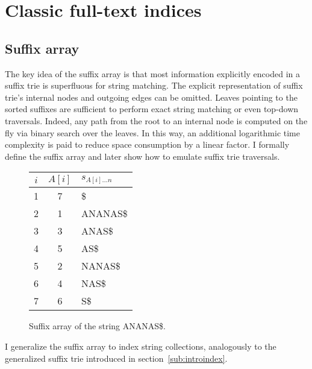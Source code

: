 \section{Classic full-text indices}

\subsection{Suffix array}

The key idea of the suffix array \citep{Manber1990} is that most information explicitly encoded in a suffix trie is superfluous for string matching.
The explicit representation of suffix trie's internal nodes and outgoing edges can be omitted.
Leaves pointing to the sorted suffixes are sufficient to perform exact string matching or even top-down traversals.
Indeed, any path from the root to an internal node is computed on the fly via binary search over the leaves.
In this way, an additional logarithmic time complexity is paid to reduce space consumption by a linear factor.
I formally define the suffix array and later show how to emulate suffix trie traversals.


\begin{figure}[h]
\begin{center}
\caption[Example of suffix array]{Suffix array of the string {\ttfamily ANANAS\$}.}
\label{fig:sa}
\ttfamily
\begin{tabular}{ccl}
$i$ & $A[i]$ & $s_{A[i]\dots n}$\\
\midrule
1 & 7 & \$\\
2 & 1 & ANANAS\$\\
3 & 3 & ANAS\$\\
4 & 5 & AS\$\\
5 & 2 & NANAS\$\\
6 & 4 & NAS\$\\
7 & 6 & S\$\\
\end{tabular}
\end{center}
\end{figure}

I generalize the suffix array to index string collections, analogously to the generalized suffix trie introduced in section~\ref{sub:introindex}.

